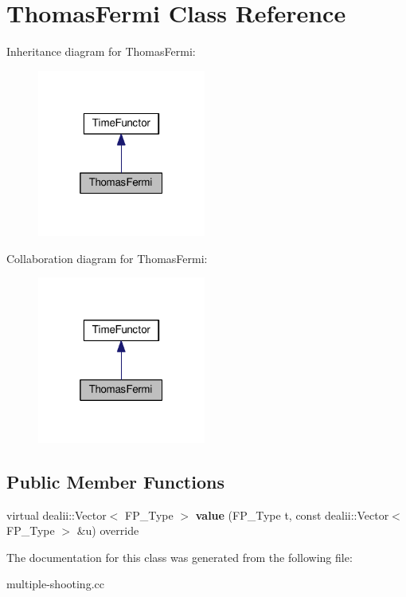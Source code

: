 \hypertarget{classThomasFermi}{}\section{Thomas\+Fermi Class Reference}
\label{classThomasFermi}


Inheritance diagram for Thomas\+Fermi\+:\nopagebreak
\begin{figure}[H]
\begin{center}
\leavevmode
\includegraphics[width=157pt]{classThomasFermi__inherit__graph}
\end{center}
\end{figure}


Collaboration diagram for Thomas\+Fermi\+:\nopagebreak
\begin{figure}[H]
\begin{center}
\leavevmode
\includegraphics[width=157pt]{classThomasFermi__coll__graph}
\end{center}
\end{figure}
\subsection*{Public Member Functions}
\begin{DoxyCompactItemize}
\item 
\mbox{\label{classThomasFermi_a75a39dd893ce044db6990e594426e006}} 
virtual dealii\+::\+Vector$<$ F\+P\+\_\+\+Type $>$ {\bfseries value} (F\+P\+\_\+\+Type t, const dealii\+::\+Vector$<$ F\+P\+\_\+\+Type $>$ \&u) override
\end{DoxyCompactItemize}


The documentation for this class was generated from the following file\+:\begin{DoxyCompactItemize}
\item 
multiple-\/shooting.\+cc\end{DoxyCompactItemize}
